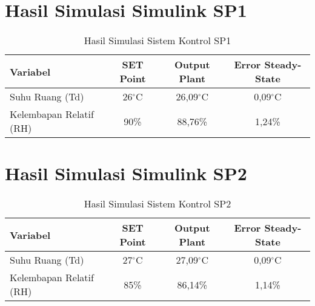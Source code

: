 \section{Hasil Simulasi Simulink SP1}

\begin{table}[!h]
	\caption{Hasil Simulasi Sistem Kontrol SP1}
	\label{tbl:A:SP1Ess}
	\centering
	\begin{tabular}{|l|c|c|c|}
		\hline
		\textbf{Variabel} & \textbf{SET Point} & \textbf{Output Plant} & \textbf{Error Steady-State}\\ \hline
		Suhu Ruang (Td) & 26$^\circ$C & 26,09$^\circ$C & 0,09$^\circ$C \\ \hline
		Kelembapan Relatif (RH) & 90\% & 88,76\% & 1,24\% \\ \hline
	\end{tabular}
\end{table}

\section{Hasil Simulasi Simulink SP2}

\begin{table}[!h]
	\caption{Hasil Simulasi Sistem Kontrol SP2}
	\label{tbl:A:SP2Ess}
	\centering
	\begin{tabular}{|l|c|c|c|}
		\hline
		\textbf{Variabel} & \textbf{SET Point} & \textbf{Output Plant} & \textbf{Error Steady-State}\\ \hline
		Suhu Ruang (Td) & 27$^\circ$C & 27,09$^\circ$C & 0,09$^\circ$C \\ \hline
		Kelembapan Relatif (RH) & 85\% & 86,14\% & 1,14\% \\ \hline
	\end{tabular}
\end{table}